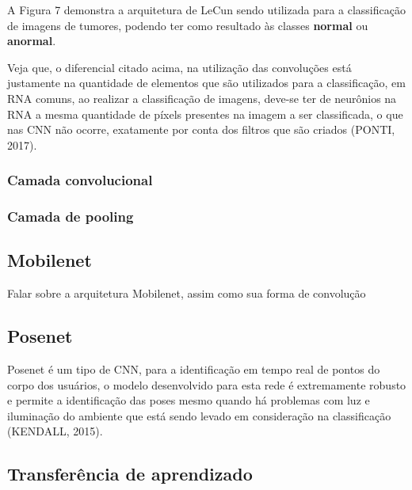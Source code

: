 A Figura 7 demonstra a arquitetura de LeCun sendo utilizada para a classificação de imagens de tumores, podendo ter como resultado às classes \textbf{normal} ou \textbf{anormal}.


Veja que, o diferencial citado acima, na utilização das convoluções está justamente na quantidade de elementos que são utilizados para a classificação, em RNA comuns, ao realizar a classificação de imagens, deve-se ter de neurônios na RNA a mesma quantidade de píxels presentes na imagem a ser classificada, o que nas CNN não ocorre, exatamente por conta dos filtros que são criados (PONTI, 2017). 

\subsubsection{Camada convolucional}

\subsubsection{Camada de pooling}


\subsection{Mobilenet}

Falar sobre a arquitetura Mobilenet, assim como sua forma de convolução

\subsection{Posenet}

\par Posenet é um tipo de CNN, para a identificação em tempo real de pontos do corpo dos usuários, o modelo desenvolvido para esta rede é extremamente robusto e permite a identificação das poses mesmo quando há problemas com luz e iluminação do ambiente que está sendo levado em consideração na classificação (KENDALL, 2015). 

\subsection{Transferência de aprendizado}

